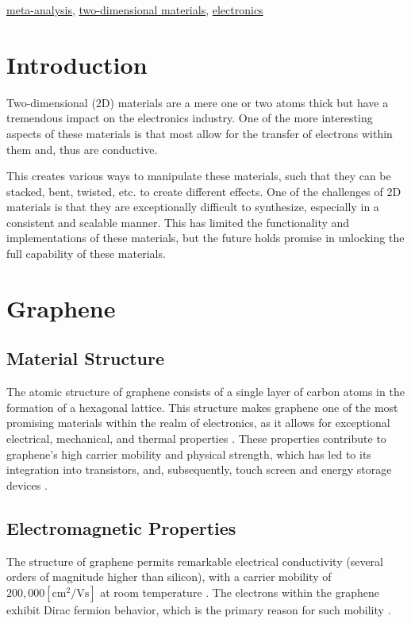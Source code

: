 \documentclass[conference]{IEEEtran}
\begin{document}
\begin{IEEEkeywords}
  \underline{meta-analysis}, \underline{two-dimensional materials}, \underline{electronics}
\end{IEEEkeywords}

\section{Introduction}

Two-dimensional (2D) materials are a mere one or two atoms thick but have a tremendous impact on the electronics industry. One of the more interesting aspects of these materials is that most allow for the transfer of electrons within them and, thus are conductive. 

This creates various ways to manipulate these materials, such that they can be stacked, bent, twisted, etc. to create different effects. 
One of the challenges of 2D materials is that they are exceptionally difficult to synthesize, especially in a consistent and scalable manner. This has limited the functionality and implementations of these materials, but the future holds promise in unlocking the full capability of these materials.

\section{Graphene}

\subsection{Material Structure}

The atomic structure of graphene consists of a single layer of carbon atoms in the formation of a hexagonal lattice. This structure makes graphene one of the most promising materials within the realm of electronics, as it allows for exceptional electrical, mechanical, and thermal properties \cite{b1}. These properties contribute to graphene's high carrier mobility and physical strength, which has led to its integration into transistors, and, subsequently, touch screen and energy storage devices \cite{b2}.

\subsection{Electromagnetic Properties}

The structure of graphene permits remarkable electrical conductivity (several orders of magnitude higher than silicon), with a carrier mobility of $200,000\left[ \si{\cm\squared\per\volt\second} \right]$ at room temperature \cite{b3}. The electrons within the graphene exhibit Dirac fermion behavior, which is the primary reason for such mobility \cite{b4}.
\end{document}
